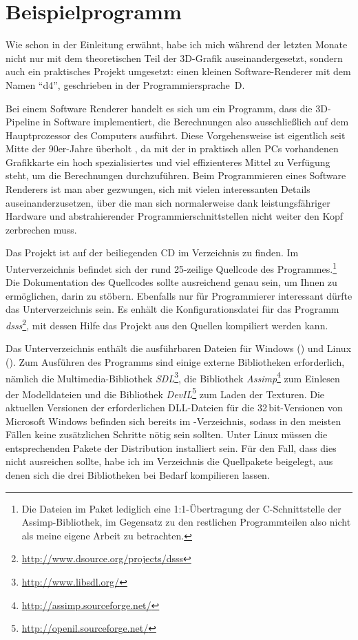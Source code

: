 \chapter{Beispielprogramm}
\label{beispielprogramm}

Wie schon in der Einleitung erwähnt, habe ich mich während der letzten Monate nicht nur mit dem theoretischen Teil der 3D-Grafik auseinandergesetzt, sondern auch ein praktisches Projekt umgesetzt: einen kleinen Software-Renderer mit dem Namen \enquote{d4}, geschrieben in der Programmiersprache~D.

Bei einem Software Renderer handelt es sich um ein Programm, dass die 3D-Pipeline in Software implementiert, die Berechnungen also ausschließlich auf dem Hauptprozessor des Computers ausführt. Diese Vorgehensweise ist eigentlich seit Mitte der 90er-Jahre überholt , da mit der in praktisch allen PCs vorhandenen Grafikkarte ein hoch spezialisiertes und viel effizienteres Mittel zu Verfügung steht, um die Berechnungen durchzuführen. Beim Programmieren eines Software Renderers ist man aber gezwungen, sich mit vielen interessanten Details auseinanderzusetzen, über die man sich normalerweise dank leistungsfähriger Hardware und abstrahierender Programmierschnittstellen nicht weiter den Kopf zerbrechen muss.

Das Projekt ist auf der beiliegenden CD im Verzeichnis  zu finden. Im Unterverzeichnis  befindet sich der rund 25-zeilige Quellcode des Programmes.\footnote{Die Dateien im Paket  lediglich eine 1:1-Übertragung der C-Schnittstelle der Assimp-Bibliothek, im Gegensatz zu den restlichen Programmteilen also nicht als meine eigene Arbeit zu betrachten.} Die Dokumentation des Quellcodes sollte ausreichend genau sein, um Ihnen zu ermöglichen, darin zu stöbern. Ebenfalls nur für Programmierer interessant dürfte das Unterverzeichnis  sein. Es enhält die Konfigurationsdatei für das Programm \emph{dsss}\footnote{\url{http://www.dsource.org/projects/dsss}}, mit dessen Hilfe das Projekt aus den Quellen kompiliert werden kann.

Das Unterverzeichnis  enthält die ausführbaren Dateien für Windows () und Linux (). Zum Ausführen des Programms sind einige externe Bibliotheken erforderlich, nämlich die Multimedia-Bibliothek \emph{SDL}\footnote{\url{http://www.libsdl.org/}}, die Bibliothek \emph{Assimp}\footnote{\url{http://assimp.sourceforge.net/}} zum Einlesen der Modelldateien und die Bibliothek \emph{DevIL}\footnote{\url{http://openil.sourceforge.net/}} zum Laden der Texturen. Die aktuellen Versionen der erforderlichen DLL-Dateien für die 32\,bit-Versionen von Microsoft Windows befinden sich bereits im -Verzeichnis, sodass in den meisten Fällen keine zusätzlichen Schritte nötig sein sollten. Unter Linux müssen die entsprechenden Pakete der Distribution installiert sein. Für den Fall, dass dies nicht ausreichen sollte, habe ich im Verzeichnis  die Quellpakete beigelegt, aus denen sich die drei Bibliotheken bei Bedarf kompilieren lassen.

